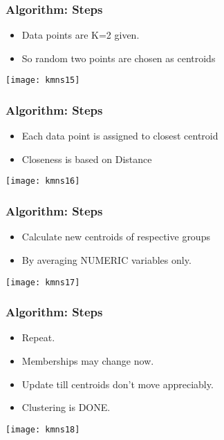 \begin{frame}[fragile]\frametitle{Algorithm: Steps}
\begin{itemize}
\item  Data points are K=2 given. 
\item So random two points are chosen as centroids
\end{itemize}

\begin{center}
\texttt{[image: kmns15]}
\end{center}
\end{frame}

\begin{frame}[fragile]\frametitle{Algorithm: Steps}
\begin{itemize}
\item  Each data point is assigned to closest centroid
\item Closeness is based on Distance
\end{itemize}
\begin{center}
\texttt{[image: kmns16]}
\end{center}
\end{frame}

\begin{frame}[fragile]\frametitle{Algorithm: Steps}
\begin{itemize}
\item Calculate new centroids of respective groups
\item By averaging NUMERIC variables only.
\end{itemize}
\begin{center}
\texttt{[image: kmns17]}
\end{center}
\end{frame}


\begin{frame}[fragile]\frametitle{Algorithm: Steps}
\begin{itemize}
\item Repeat.
\item Memberships may change now.
\item Update till centroids don't move appreciably.
\item Clustering is DONE.
\end{itemize}
\begin{center}
\texttt{[image: kmns18]}
\end{center}
\end{frame}


